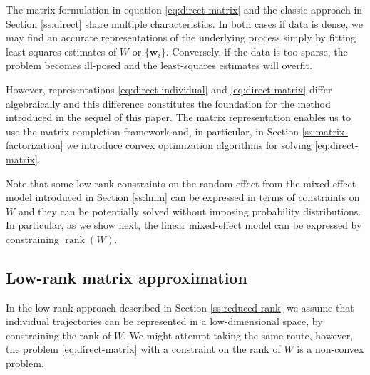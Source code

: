 \documentclass[preprint]{imsart}
\numberwithin{equation}{section}
\theoremstyle{plain}
\newcommand{\N}{\mathbb{N}}
\newcommand{\bw}{\mathbf{w}}
\DeclareMathOperator*{\rank}{rank}
\begin{document}
The matrix formulation in equation \eqref{eq:direct-matrix} and the classic approach in Section \ref{ss:direct} share multiple characteristics. In both cases if data is dense, we may find an accurate representations of the underlying process simply by fitting least-squares estimates of $W$ or $\{\bw_i\}$. Conversely, if the data is too sparse, the problem becomes ill-posed and the least-squares estimates will overfit. %

However, representations \eqref{eq:direct-individual} and \eqref{eq:direct-matrix} differ algebraically and this difference constitutes the foundation for the method introduced in the sequel of this paper. The matrix representation enables us to use the matrix completion framework and, in particular, in Section \ref{ss:matrix-factorization} we introduce convex optimization algorithms for solving \eqref{eq:direct-matrix}. %

Note that some low-rank constraints on the random effect from the mixed-effect model introduced in Section \ref{ss:lmm} can be expressed in terms of constraints on $W$ and they can be potentially solved without imposing probability distributions. In particular, as we show next, the linear mixed-effect model can be expressed by constraining $\rank(W)$. %

\subsection{Low-rank matrix approximation}\label{ss:low-rank-matrix}
In the low-rank approach described in Section \ref{ss:reduced-rank} we assume that individual trajectories can be represented in a low-dimensional space, by constraining the rank of $W$. We might attempt taking the same route, however, the problem \eqref{eq:direct-matrix} with a constraint on the rank of $W$ is a non-convex problem.

\end{document}
